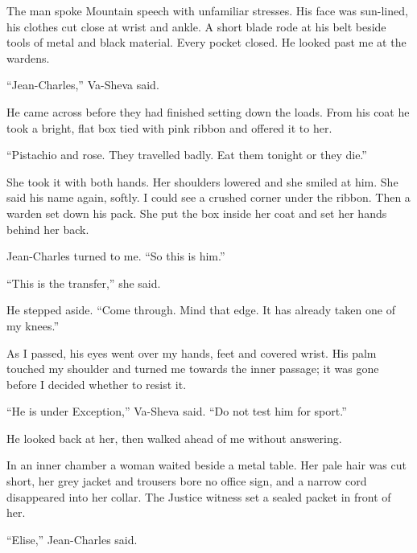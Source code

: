 The man spoke Mountain speech with unfamiliar stresses. His face was sun-lined, his clothes cut close at wrist and ankle. A short blade rode at his belt beside tools of metal and black material. Every pocket closed. He looked past me at the wardens.\par

``Jean-Charles,'' Va-Sheva said.\par

He came across before they had finished setting down the loads. From his coat he took a bright, flat box tied with pink ribbon and offered it to her.\par

``Pistachio and rose. They travelled badly. Eat them tonight or they die.''\par

She took it with both hands. Her shoulders lowered and she smiled at him. She said his name again, softly. I could see a crushed corner under the ribbon. Then a warden set down his pack. She put the box inside her coat and set her hands behind her back.\par

Jean-Charles turned to me. ``So this is him.''\par

``This is the transfer,'' she said.\par

He stepped aside. ``Come through. Mind that edge. It has already taken one of my knees.''\par

As I passed, his eyes went over my hands, feet and covered wrist. His palm touched my shoulder and turned me towards the inner passage; it was gone before I decided whether to resist it.\par

``He is under Exception,'' Va-Sheva said. ``Do not test him for sport.''\par

He looked back at her, then walked ahead of me without answering.\par

\ornament

In an inner chamber a woman waited beside a metal table. Her pale hair was cut short, her grey jacket and trousers bore no office sign, and a narrow cord disappeared into her collar. The Justice witness set a sealed packet in front of her.\par

``Elise,'' Jean-Charles said.\par

